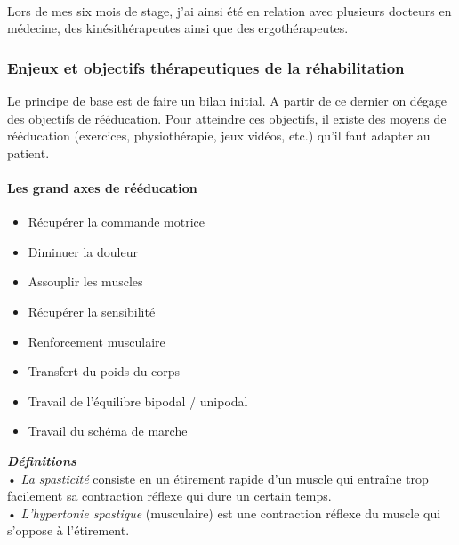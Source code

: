 	\paragraph{}
Lors de mes six mois de stage, j'ai ainsi été en relation avec plusieurs docteurs en médecine, des kinésithérapeutes ainsi que des ergothérapeutes.

	\subsubsection{Enjeux et objectifs thérapeutiques de la réhabilitation} \label{objectifs_therapeutiques}
Le principe de base est de faire un bilan initial.  A partir de ce dernier on dégage des objectifs  de rééducation. Pour atteindre ces objectifs, il existe des moyens de rééducation (exercices, physiothérapie, jeux vidéos, etc.) qu'il faut adapter au patient.

\paragraph{Les grand axes de rééducation}
\begin{itemize} 
	\item Récupérer la commande motrice 
	\item Diminuer la douleur
	\item Assouplir les muscles 
	\item Récupérer la sensibilité 
	\item Renforcement musculaire 
	\item Transfert du poids du corps 
	\item Travail de l'équilibre bipodal / unipodal 
	\item Travail du schéma de marche
\end{itemize}

	\textbf{\emph{Définitions}\\}
• \emph{La spasticité} consiste en un étirement rapide d'un muscle qui entraîne trop facilement sa contraction réflexe qui dure un certain temps. \\
• \emph{L’hypertonie spastique} (musculaire) est une contraction réflexe du muscle qui s'oppose à l'étirement.\\

